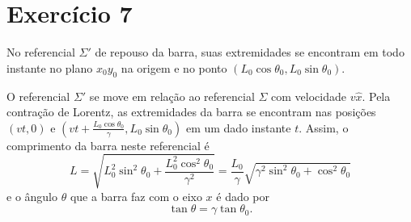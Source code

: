 \section*{Exercício 7}
No referencial \(\Sigma'\) de repouso da barra, suas extremidades se encontram em todo instante no plano \(x_0y_0\) na origem e no ponto \((L_0 \cos\theta_0, L_0 \sin \theta_0)\).

O referencial \(\Sigma'\) se move em relação ao referencial \(\Sigma\) com velocidade \(v\hat{x}\). Pela contração de Lorentz, as extremidades da barra se encontram nas posições \(\left(vt,0\right)\) e \(\left(vt + \frac{L_0\cos\theta_0}{\gamma}, L_0\sin\theta_0\right)\) em um dado instante \(t\). Assim, o comprimento da barra neste referencial é
\begin{equation*}
    L = \sqrt{L_0^2\sin^2\theta_0 + \frac{L_0^2\cos^2\theta_0}{\gamma^2}} = \frac{L_0}{\gamma} \sqrt{\gamma^2\sin^2\theta_0 + \cos^2\theta_0}
\end{equation*}
e o ângulo \(\theta\) que a barra faz com o eixo \(x\) é dado por
\begin{equation*}
    \tan \theta = \gamma \tan \theta_0.
\end{equation*}

